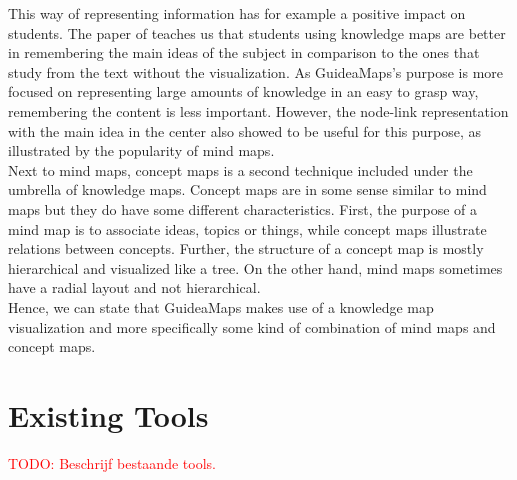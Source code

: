 This way of representing information has for example a positive impact on students. The paper of \cite{knowledgemapsodonnell} teaches us that students using knowledge maps are better in remembering the main ideas of the subject in comparison to the ones that study from the text without the visualization. As GuideaMaps's purpose is more focused on representing large amounts of knowledge in an easy to grasp way, remembering the content is less important. However, the node-link representation with the main idea in the center also showed to be useful for this purpose, as illustrated by the popularity of mind maps.\\

Next to mind maps, concept maps is a second technique included under the umbrella of knowledge maps. Concept maps are in some sense similar to mind maps but they do have some different characteristics. First, the purpose of a mind map is to associate ideas, topics or things, while concept maps illustrate relations between concepts. Further, the structure of a concept map is mostly hierarchical and visualized like a tree. On the other hand, mind maps sometimes have a radial layout and not hierarchical. \citep{davies} \\

Hence, we can state that GuideaMaps makes use of a knowledge map visualization and more specifically some kind of combination of mind maps and concept maps.



\section{Existing Tools}\label{sec:existing-tools}
\textcolor{red}{TODO: Beschrijf bestaande tools.}


